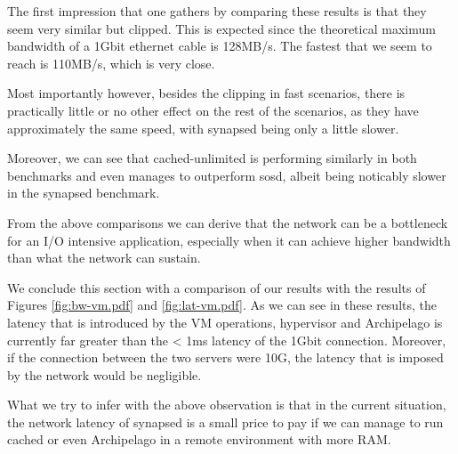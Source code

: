 The first impression that one gathers by comparing these results is that they 
seem very similar but clipped. This is expected since the theoretical maximum 
bandwidth of a 1Gbit ethernet cable is 128MB/s. The fastest that we seem to 
reach is 110MB/s, which is very close. 

Most importantly however, besides the clipping in fast scenarios, there is 
practically little or no other effect on the rest of the scenarios, as they 
have approximately the same speed, with synapsed being only a little slower.

Moreover, we can see that cached-unlimited is performing similarly in both 
benchmarks and even manages to outperform sosd, albeit being noticably slower 
in the synapsed benchmark.

From the above comparisons we can derive that the network can be a bottleneck 
for an I/O intensive application, especially when it can achieve higher 
bandwidth than what the network can sustain.

We conclude this section with a comparison of our results with the results of 
Figures \ref{fig:bw-vm.pdf} and \ref{fig:lat-vm.pdf}. As we can see in these 
results, the latency that is introduced by the VM operations, hypervisor and 
Archipelago is currently far greater than the < 1ms latency of the 1Gbit 
connection. Moreover, if the connection between the two servers were 10G, the 
latency that is imposed by the network would be negligible.

What we try to infer with the above observation is that in the current 
situation, the network latency of synapsed is a small price to pay if we can 
manage to run cached or even Archipelago in a remote environment with more RAM.
